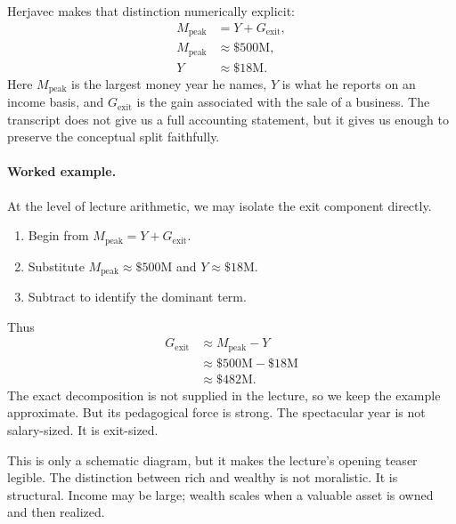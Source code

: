 Herjavec makes that distinction numerically explicit:
\begin{align}
M_{\mathrm{peak}} &= Y + G_{\mathrm{exit}},\\
M_{\mathrm{peak}} &\approx \$500\text{M},\\
Y &\approx \$18\text{M}.
\end{align}
Here \(M_{\mathrm{peak}}\) is the largest money year he names, \(Y\) is what he reports on an income basis, and \(G_{\mathrm{exit}}\) is the gain associated with the sale of a business. The transcript does not give us a full accounting statement, but it gives us enough to preserve the conceptual split faithfully.

\paragraph{Worked example.} At the level of lecture arithmetic, we may isolate the exit component directly.
\begin{enumerate}
\item Begin from \(M_{\mathrm{peak}} = Y + G_{\mathrm{exit}}\).
\item Substitute \(M_{\mathrm{peak}} \approx \$500\text{M}\) and \(Y \approx \$18\text{M}\).
\item Subtract to identify the dominant term.
\end{enumerate}
Thus
\begin{align}
G_{\mathrm{exit}}
&\approx M_{\mathrm{peak}} - Y \\
&\approx \$500\text{M} - \$18\text{M} \\
&\approx \$482\text{M}.
\end{align}
The exact decomposition is not supplied in the lecture, so we keep the example approximate. But its pedagogical force is strong. The spectacular year is not salary-sized. It is exit-sized.

\begin{figure}
\centering
{}
\end{figure}

This is only a schematic diagram, but it makes the lecture's opening teaser legible. The distinction between rich and wealthy is not moralistic. It is structural. Income may be large; wealth scales when a valuable asset is owned and then realized.


